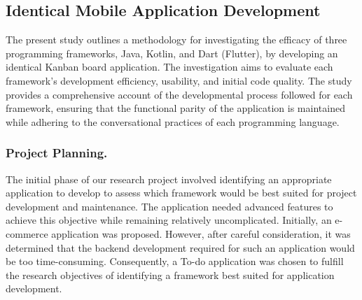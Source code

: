 \subsection{Identical Mobile Application Development}
The present study outlines a methodology for investigating the efficacy of three programming frameworks, Java, Kotlin, and Dart (Flutter), by developing an identical Kanban board application. The investigation aims to evaluate each framework's development efficiency, usability, and initial code quality. The study provides a comprehensive account of the developmental process followed for each framework, ensuring that the functional parity of the application is maintained while adhering to the conversational practices of each programming language.
\subsubsection{Project Planning.}
The initial phase of our research project involved identifying an appropriate application to develop to assess which framework would be best suited for project development and maintenance. The application needed advanced features to achieve this objective while remaining relatively uncomplicated. Initially, an e-commerce application was proposed. However, after careful consideration, it was determined that the backend development required for such an application would be too time-consuming. Consequently, a To-do application was chosen to fulfill the research objectives of identifying a framework best suited for application development.
\par

